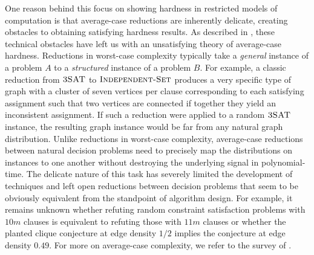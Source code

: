One reason behind this focus on showing hardness in restricted models of computation is that average-case reductions are inherently delicate, creating obstacles to obtaining satisfying hardness results. As described in \cite{Barak2017}, these technical obstacles have left us with an unsatisfying theory of average-case hardness. Reductions in worst-case complexity typically take a \textit{general} instance of a problem $A$ to a \textit{structured} instance of a problem $B$. For example, a classic reduction from $\textsc{3SAT}$ to $\textsc{Independent-Set}$ produces a very specific type of graph with a cluster of seven vertices per clause corresponding to each satisfying assignment such that two vertices are connected if together they yield an inconsistent assignment. If such a reduction were applied to a random $\textsc{3SAT}$ instance, the resulting graph instance would be far from any natural graph distribution. Unlike reductions in worst-case complexity, average-case reductions between natural decision problems need to precisely map the distributions on instances to one another without destroying the underlying signal in polynomial-time. The delicate nature of this task has severely limited the development of techniques and left open reductions between decision problems that seem to be obviously equivalent from the standpoint of algorithm design. For example, it remains unknown whether refuting random constraint satisfaction problems with $10m$ clauses is equivalent to refuting those with $11m$ clauses or whether the planted clique conjecture at edge density $1/2$ implies the conjecture at edge density $0.49$.
For more on average-case complexity, we refer to the survey of \cite{bogdanov2006average}.

